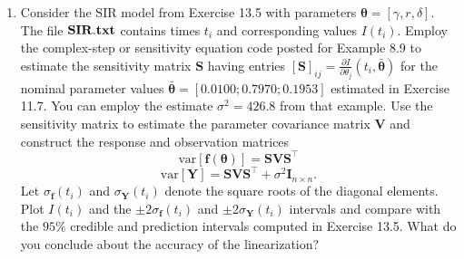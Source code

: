 \documentclass[11pt]{article}
\begin{document}
\begin{enumerate}
\begin{enumerate}
    \item Since we performed Bayesian model calibration using DRAM in the previous project, we skipped that part. It’s worth noting that the chains are converged. Hence, we can use these results to propagate parameter uncertainty for the model response. Then, using the DRAM commands {\bf mcmcpred} and {\bf mcmcpredplot}, we construct $95\%$ credible andprediction intervals for given data in $\mathbf{SIR.txt}$. Figure \ref{fig4}(a) shows the graphs of the credible and prediction intervals.
    \item We used the DRAM algorithm for this problem in Project 3. Here we observed that the chains have all converged. Since we have a converged chain, we obtained the $95\%$ credible intervals using posterior samples. The graph in Figure \ref{fig4} was obtained using the {\bf mcmcpred} and {\bf mcmcpredplot} commands.
\end{enumerate}

\begin{figure*}[!hbt]
\caption{Data, $95\%$ credible and prediction interval using (a) data in $\mathbf{SIR.txt}$; (b) Influenza data, Table \ref{tab4}.}
\label{fig4}
\end{figure*}
    \item Consider the SIR model from Exercise 13.5 with parameters $\pmb{\theta} = [\gamma, r,\delta ]$. The file ${\bf SIR.txt}$ contains times $t_i$ and corresponding values $I(t_i)$. Employ the complex-step or sensitivity equation code posted for Example 8.9 to estimate the sensitivity matrix $\mathbf{S}$ having entries $[\mathbf{S}]_{ij} = \frac{ \partial I}{\partial \theta_j}(t_i, \pmb{\bar\theta})$ 
for the nominal parameter values $\pmb{\bar \theta}=  [0.0100; 0.7970; 0.1953]$ estimated in Exercise 11.7. You can employ the estimate $ \sigma^2= 426.8$ from that example. Use the sensitivity matrix to estimate the parameter covariance matrix $\mathbf{V}$ and construct the response and observation matrices
$$\mbox{var}[\pmb{f(\theta)}] = \mathbf{SVS}^\top$$
$$\mbox{var}[\mathbf{Y}] = \mathbf{SVS}^\top + \sigma^2 \mathbf{I}_{n\times n}.$$ Let  $\sigma_{\pmb{f}}(t_i)$ and $\sigma_{\mathbf{Y}}(t_i)$ denote the square roots of the diagonal elements. Plot $I(t_i)$ and the $\pm 2\sigma_{\pmb{f}}(t_i)$ and $\pm 2\sigma_{\mathbf{Y}}(t_i)$ intervals and compare with the $95\%$ credible and prediction intervals computed in Exercise 13.5. What do you conclude about the accuracy of the linearization?


\end{enumerate}
\end{document}
